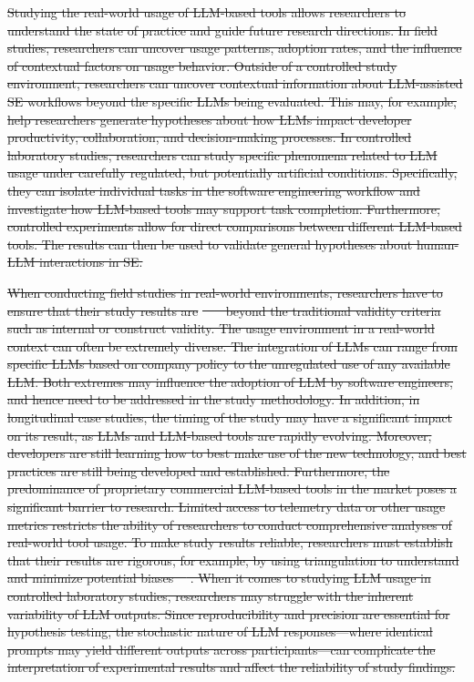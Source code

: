\documentclass[smallextended]{svjour3}
\newcommand*{\enq}[1]{\enquote{{\itshape#1}}}
\newcommand{\studytypeparagraph}[1]{\paragraph{\bfseries #1:}}
\providecommand{\DIFdeltex}[1]{{\protect\color{red}\sout{#1}}}                      %
\providecommand{\DIFdelbegin}{} %
\providecommand{\DIFdel}[1]{\texorpdfstring{\DIFdeltex{#1}}{}} %
\newcommand{\DIFscaledelfig}{0.5}
\newlength{\DIFdelgraphicswidth} %
\newlength{\DIFdelgraphicsheight} %
\newcommand{\DIFdelincludegraphics}[2][]{%
\sbox{\DIFdelgraphicsbox}{\DIFOincludegraphics[#1]{#2}}%
\settoboxwidth{\DIFdelgraphicswidth}{\DIFdelgraphicsbox} %
\settoboxtotalheight{\DIFdelgraphicsheight}{\DIFdelgraphicsbox} %
\scalebox{\DIFscaledelfig}{%
\parbox[b]{\DIFdelgraphicswidth}{\usebox{\DIFdelgraphicsbox}\\[-\baselineskip] \rule{\DIFdelgraphicswidth}{0em}}\llap{\resizebox{\DIFdelgraphicswidth}{\DIFdelgraphicsheight}{%
\setlength{\unitlength}{\DIFdelgraphicswidth}%
\begin{picture}(1,1)%
\thicklines\linethickness{2pt} %
{\color[rgb]{1,0,0}\put(0,0){\framebox(1,1){}}}%
{\color[rgb]{1,0,0}\put(0,0){\line( 1,1){1}}}%
{\color[rgb]{1,0,0}\put(0,1){\line(1,-1){1}}}%
\end{picture}%
}\hspace*{3pt}}} %
} %
\DeclareRobustCommand{\DIFdelbegin}{\DIFOdelbegin \let\includegraphics\DIFdelincludegraphics} %
\begin{document}
\DIFdelbegin %

\DIFdel{Studying the real-world usage of LLM-based tools allows researchers to understand the state of practice and guide future research directions.
In field studies, researchers can uncover usage patterns, adoption rates, and the influence of contextual factors on usage behavior.
Outside of a controlled study environment, researchers can uncover contextual information about LLM-assisted SE workflows beyond the specific LLMs being evaluated.
This may, for example, help researchers generate hypotheses about how LLMs impact developer productivity, collaboration, and decision-making processes.
In controlled laboratory studies, researchers can study specific phenomena related to LLM usage under carefully regulated, but potentially artificial conditions.
Specifically, they can isolate individual tasks in the software engineering workflow and investigate how LLM-based tools may support task completion.
Furthermore, controlled experiments allow for direct comparisons between different LLM-based tools.
The results can then be used to validate general hypotheses about human-LLM interactions in SE.
}%


\DIFdel{When conducting field studies in real-world environments, researchers have to ensure that their study results are }%
\DIFdel{~\mbox{%
\cite{Sullivan2011-ub} }\hskip0pt%
beyond the traditional validity criteria such as internal or construct validity.
The usage environment in a real-world context can often be extremely diverse.
The integration of LLMs can range from specific LLMs based on company policy to the unregulated use of any available LLM. 
Both extremes may influence the adoption of LLM by software engineers, and hence need to be addressed in the study methodology.
In addition, in longitudinal case studies, the timing of the study may have a significant impact on its result, as LLMs and LLM-based tools are rapidly evolving.
Moreover, developers are still learning how to best make use of the new technology, and best practices are still being developed and established.
Furthermore, the predominance of proprietary commercial LLM-based tools in the market poses a significant barrier to research.
Limited access to telemetry data or other usage metrics restricts the ability of researchers to conduct comprehensive analyses of real-world tool usage.
To make study results reliable, researchers must establish that their results are rigorous, for example, by using triangulation to understand and minimize potential biases~\mbox{%
\cite{Sullivan2011-ub}}\hskip0pt%
.
When it comes to studying LLM usage in controlled laboratory studies, researchers may struggle with the inherent variability of LLM outputs.
Since reproducibility and precision are essential for hypothesis testing, the stochastic nature of LLM responses---where identical prompts may yield different outputs across participants---can complicate the interpretation of experimental results and affect the reliability of study findings.
 }%
\end{document}
